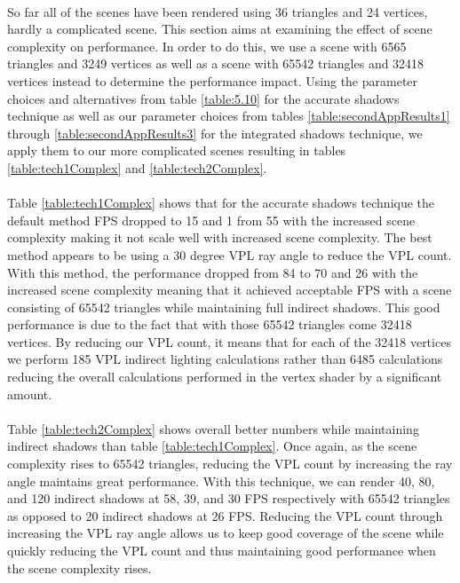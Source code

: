 \paragraph{}
So far all of the scenes have been rendered using 36 triangles and 24 vertices, hardly a complicated scene.  This section aims at examining the effect of scene complexity on performance.  In order to do this, we use a scene with 6565 triangles and 3249 vertices as well as a scene with 65542 triangles and 32418 vertices instead to determine the performance impact.  Using the parameter choices and alternatives from table \ref{table:5.10} for the accurate shadows technique as well as our parameter choices from tables \ref{table:secondAppResults1} through \ref{table:secondAppResults3} for the integrated shadows technique, we apply them to our more complicated scenes resulting in tables \ref{table:tech1Complex} and \ref{table:tech2Complex}.

\paragraph{}
Table \ref{table:tech1Complex} shows that for the accurate shadows technique the default method FPS dropped to 15 and 1 from 55 with the increased scene complexity making it not scale well with increased scene complexity.  The best method appears to be using a 30 degree VPL ray angle to reduce the VPL count.  With this method, the performance dropped from 84 to 70 and 26 with the increased scene complexity meaning that it achieved acceptable FPS with a scene consisting of 65542 triangles while maintaining full indirect shadows.  This good performance is due to the fact that with those 65542 triangles come 32418 vertices.  By reducing our VPL count, it means that for each of the 32418 vertices we perform 185 VPL indirect lighting calculations rather than 6485 calculations reducing the overall calculations performed in the vertex shader by a significant amount.

\paragraph{}
Table \ref{table:tech2Complex} shows overall better numbers while maintaining indirect shadows than table \ref{table:tech1Complex}.  Once again, as the scene complexity rises to 65542 triangles, reducing the VPL count by increasing the ray angle maintains great performance.  With this technique, we can render 40, 80, and 120 indirect shadows at 58, 39, and 30 FPS respectively with 65542 triangles as opposed to 20 indirect shadows at 26 FPS.  Reducing the VPL count through increasing the VPL ray angle allows us to keep good coverage of the scene while quickly reducing the VPL count and thus maintaining good performance when the scene complexity rises.

